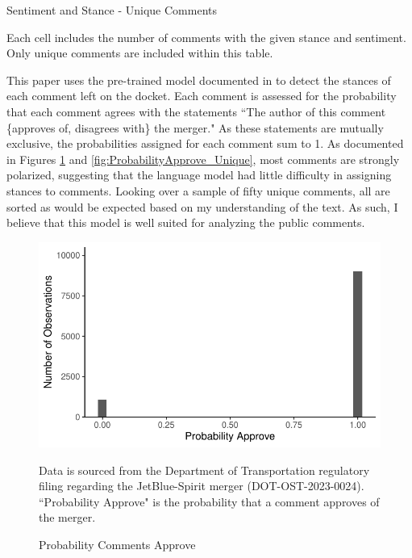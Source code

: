 \documentclass{article}
\begin{document}
\begin{appendices}
\begin{table}
    \caption{Sentiment and Stance - Unique Comments}
    \label{tab:Sentiment_Stance_Table}
    \vspace{-15mm}
    \begin{center}
    
    \end{center}
        \vspace{-5mm}
    \footnotesize{Each cell includes the number of comments with the given stance and sentiment. Only unique comments are included within this table. }
\end{table}

This paper uses the pre-trained model documented in \citet{laurer_less_2024} to detect the stances of each comment left on the docket. Each comment is assessed for the probability that each comment agrees with the statements ``The author of this comment \{approves of, disagrees with\} the merger." As these statements are mutually exclusive, the probabilities assigned for each comment sum to 1. As documented in Figures \ref{fig:ProbabilityApprove} and \ref{fig:ProbabilityApprove_Unique}, most comments are strongly polarized, suggesting that the language model had little difficulty in assigning stances to comments. Looking over a sample of fifty unique comments, all are sorted as would be expected based on my understanding of the text. As such, I believe that this model is well suited for analyzing the public comments.  

	\begin{figure}
		\caption{Probability Comments Approve}
		\label{fig:ProbabilityApprove}
        \begin{center}
        \includegraphics{05.Figures/stance_strength_graph}
        \end{center}
		\begin{minipage}{\textwidth} 
			{\footnotesize Data is sourced from the Department of Transportation regulatory filing regarding the JetBlue-Spirit merger (DOT-OST-2023-0024). ``Probability Approve" is the probability that a comment approves of the merger.} 
		\end{minipage}
	\end{figure}
	

\end{appendices}
\end{document}
